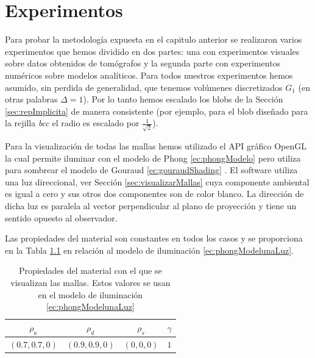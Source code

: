 \chapter{Experimentos}
\label{chap:experimetos}
Para probar la metodología expuesta en el capitulo anterior se realizaron varios experimentos que hemos dividido en dos partes: una con experimentos visuales sobre datos obtenidos de tomógrafos y la segunda parte con experimentos numéricos sobre modelos analíticos. Para todos nuestros experimentos hemos asumido, sin perdida de generalidad, que tenemos volúmenes discretizados $G_{1}$ (en otras palabras $\Delta = 1$). Por lo tanto hemos escalado los blobs de la Sección \ref{sec:repImplicita} de manera consistente (por ejemplo, para el blob diseñado para la rejilla \emph{bcc} el radio es escalado por $\frac{1}{\sqrt{2}}$).

Para la visualización de todas las mallas hemos utilizado el API gráfico OpenGL\texttrademark \cite{openGLSite} la cual permite iluminar con el modelo de Phong \eqref{ec:phongModelo} pero utiliza para sombrear el modelo de Gouraud \eqref{ec:gouraudShading} \cite{redBook}. El software utiliza una luz direccional, ver Sección \ref{sec:visualizarMallas} cuya componente ambiental es igual a cero y sus otros dos componentes son de color blanco. La dirección de dicha luz es paralela al vector perpendicular al plano de proyección y tiene un sentido opuesto al observador.

Las propiedades del material son constantes en todos los casos y se proporciona en la Tabla \ref{table:material} en relación al modelo de iluminación \eqref{ec:phongModelunaLuz}. 

\begin{table}[htp]
\begin{center}
  \begin{tabular}{|c|c|c|c|}
    \hline
    $\rho_a$ & $\rho_d$ & $\rho_s$ & $\gamma$ \\
    \hline
    $(0.7, 0.7, 0)$ & $(0.9, 0.9, 0)$ & $(0, 0, 0)$ & $1$  \\
    \hline
  \end{tabular}
\end{center}
\caption[Propiedades del material con el que se visualizan las mallas]{Propiedades del material con el que se visualizan las mallas. Estos valores se usan en el modelo de iluminación \eqref{ec:phongModelunaLuz}}
\label{table:material}
\end{table}


